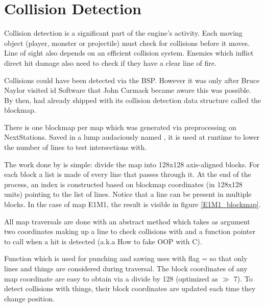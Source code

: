 \section{Collision Detection} \label{blockmapdetails}
Collision detection is a significant part of the engine's activity. Each moving object (player, monster or projectile) must check for collisions before it moves. Line of sight also depends on an efficient collision system. Enemies which inflict direct hit damage also need to check if they have a clear line of fire.\\
\par
Collisions could have been detected via the BSP. However it was only after Bruce Naylor visited id Software that John Carmack became aware this was possible. By then, \doom{} had already shipped with its collision detection data structure called the blockmap.\\
\par
\vspace{10pt}
\par
There is one blockmap per map which was generated via  preprocessing on NextStations. Saved in a lump audaciously named , it is used at runtime to lower the number of lines to test intersections with.\\
\par
The work done by  is simple: divide the map into 128x128 axis-aligned blocks. For each block a list is made of every line that passes through it. At the end of the process, an index is constructed based on blockmap coordinates (in 128x128 units) pointing to the list of lines. Notice that a line can be present in multiple blocks. In the case of map E1M1, the result is visible in figure \ref{E1M1_blockmap}.


All map traversals are done with an abstract method  which takes as argument two coordinates making up a line to check collisions with and a function pointer to call when a hit is detected (a.k.a How to fake OOP with C).\\
\par
{}
\par
Function  which is used for punching and sawing uses  with flag =  so that only lines and things are considered during traversal. The block coordinates of any map coordinate are easy to obtain via a divide by 128 (optimized as $\gg$ 7). To detect collisions with things, their block coordinates are updated each time they change position.\\
\par
{}
